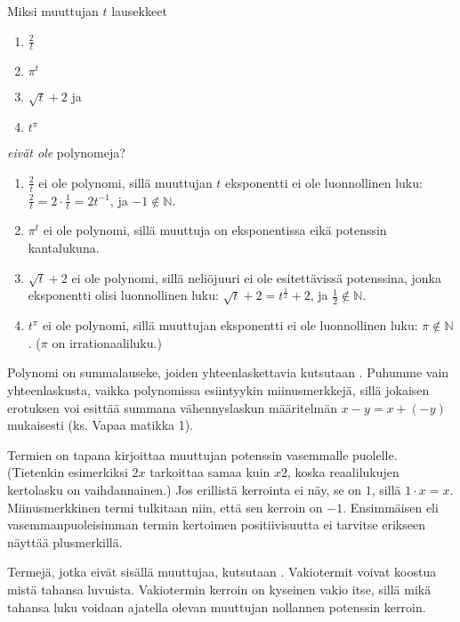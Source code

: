 \begin{esimerkki}

Miksi muuttujan $t$ lausekkeet 
\begin{enumerate}
\item $\frac{2}{t}$
\item $\pi^t$
\item $\sqrt{t}+2$ ja
\item $t^\pi$
\end{enumerate}

\emph{eivät ole} polynomeja?

	\begin{esimratk}

\begin{enumerate}
\item $\frac{2}{t}$ ei ole polynomi, sillä muuttujan $t$ eksponentti ei ole luonnollinen luku: $\frac{2}{t}=2 \cdot \frac{1}{t}= 2t^{-1}$, ja $-1 \notin \mathbb{N}$.
\item $\pi^t$ ei ole polynomi, sillä muuttuja on eksponentissa eikä potenssin kantalukuna.
\item $\sqrt{t}+2$ ei ole polynomi, sillä neliöjuuri ei ole esitettävissä potenssina, jonka eksponentti olisi luonnollinen luku: $\sqrt{t}+2=t^{\frac{1}{2}}+2$, ja $\frac{1}{2} \notin \mathbb{N}$.
\item $t^{\pi}$ ei ole polynomi, sillä muuttujan eksponentti ei ole luonnollinen luku: $\pi \notin \mathbb{N}$. ($\pi$ on irrationaaliluku.)
\end{enumerate}

	\end{esimratk}
\end{esimerkki}

Polynomi on summalauseke, joiden yhteenlaskettavia kutsutaan . Puhumme vain yhteenlaskusta, vaikka polynomissa esiintyykin miinusmerkkejä, sillä jokaisen erotuksen voi esittää summana vähennyslaskun määritelmän $x-y=x+(-y)$ mukaisesti (ks. Vapaa matikka 1).

Termien  on tapana kirjoittaa muuttujan potenssin vasemmalle puolelle. (Tietenkin esimerkiksi $2x$ tarkoittaa samaa kuin $x2$, koska reaalilukujen kertolasku on vaihdannainen.) Jos erillistä kerrointa ei näy, se on $1$, sillä $1\cdot x=x$. Miinusmerkkinen termi tulkitaan niin, että sen kerroin on $-1$. Ensimmäisen eli vasemmanpuoleisimman termin kertoimen positiivisuutta ei tarvitse erikseen näyttää plusmerkillä.

Termejä, jotka eivät sisällä muuttujaa, kutsutaan . Vakiotermit voivat koostua mistä tahansa luvuista. Vakiotermin kerroin on kyseinen vakio itse, sillä mikä tahansa luku voidaan ajatella olevan muuttujan nollannen potenssin kerroin.

